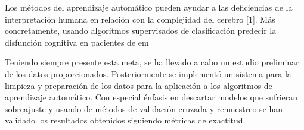 Los métodos del aprendizaje automático pueden ayudar a las deficiencias de la interpretación humana en relación con la complejidad del cerebro [1]. Más concretamente, usando algoritmos supervisados de clasificación predecir la disfunción cognitiva en pacientes de \gls{em}

Teniendo siempre presente esta meta, se ha llevado a cabo un estudio preliminar de los datos proporcionados. Posteriormente se implementó un sistema para la limpieza y preparación de los datos para la aplicación a los algoritmos de aprendizaje automático. Con especial énfasis en descartar modelos que sufrieran sobreajuste y usando de métodos de validación cruzada y remuestreo se han validado los resultados obtenidos siguiendo métricas de exactitud.